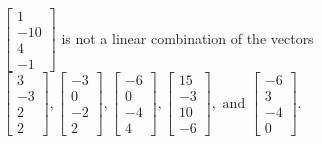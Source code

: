 \begin{exercise}
\begin{exerciseStatement}
  \end{exerciseStatement}
  \begin{exerciseAnswer}
   \(\left[\begin{array}{c}
1 \\
-10 \\
4 \\
-1
\end{array}\right]\) 
  	 is not  
	a linear combination of the vectors \(\left[\begin{array}{c}
3 \\
-3 \\
2 \\
2
\end{array}\right] , \left[\begin{array}{c}
-3 \\
0 \\
-2 \\
2
\end{array}\right] , \left[\begin{array}{c}
-6 \\
0 \\
-4 \\
4
\end{array}\right] , \left[\begin{array}{c}
15 \\
-3 \\
10 \\
-6
\end{array}\right] , \text{ and } \left[\begin{array}{c}
-6 \\
3 \\
-4 \\
0
\end{array}\right]\).

	
  


  \end{exerciseAnswer}
\end{exercise}